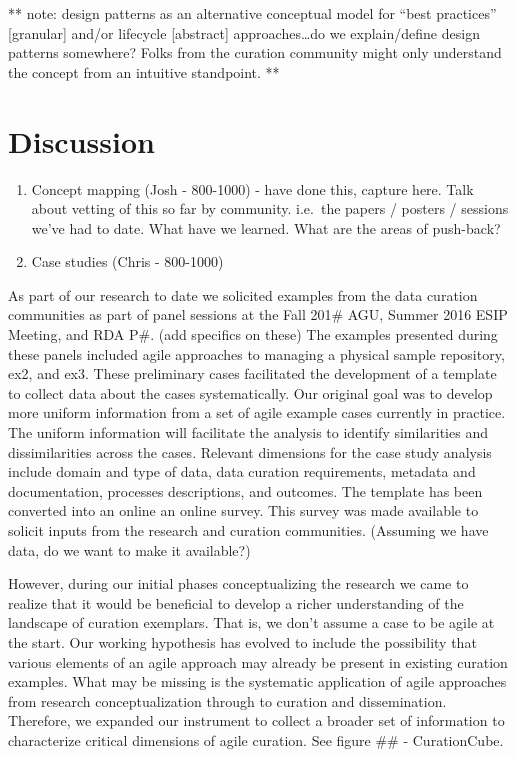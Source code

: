 \documentclass[paper]{ijdc-v9}
\begin{document}
** note: design patterns as an alternative conceptual model for ``best
practices'' {[}granular{]} and/or lifecycle {[}abstract{]}
approaches\ldots{}do we explain/define design patterns somewhere? Folks
from the curation community might only understand the concept from an
intuitive standpoint. **

\section{Discussion}\label{discussion}

\begin{enumerate}
\def\labelenumi{\arabic{enumi}.}
\item
  Concept mapping (Josh - 800-1000) - have done this, capture here. Talk
  about vetting of this so far by community. i.e.~the papers / posters /
  sessions we've had to date. What have we learned. What are the areas
  of push-back?
\item
  Case studies (Chris - 800-1000)
\end{enumerate}

As part of our research to date we solicited examples from the data
curation communities as part of panel sessions at the Fall 201\# AGU,
Summer 2016 ESIP Meeting, and RDA P\#. (add specifics on these) The
examples presented during these panels included agile approaches to
managing a physical sample repository, ex2, and ex3. These preliminary
cases facilitated the development of a template to collect data about
the cases systematically. Our original goal was to develop more uniform
information from a set of agile example cases currently in practice. The
uniform information will facilitate the analysis to identify
similarities and dissimilarities across the cases. Relevant dimensions
for the case study analysis include domain and type of data, data
curation requirements, metadata and documentation, processes
descriptions, and outcomes. The template has been converted into an
online an online survey. This survey was made available to solicit
inputs from the research and curation communities. (Assuming we have
data, do we want to make it available?)

However, during our initial phases conceptualizing the research we came
to realize that it would be beneficial to develop a richer understanding
of the landscape of curation exemplars. That is, we don't assume a case
to be agile at the start. Our working hypothesis has evolved to include
the possibility that various elements of an agile approach may already
be present in existing curation examples. What may be missing is the
systematic application of agile approaches from research
conceptualization through to curation and dissemination. Therefore, we
expanded our instrument to collect a broader set of information to
characterize critical dimensions of agile curation. See figure \#\# -
CurationCube.
\end{document}
